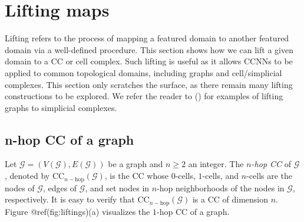\documentclass[
  12pt,
]{krantz}
\begin{document}
\section{Lifting maps}\label{lifting-maps}

Lifting refers to the process of mapping a featured domain to another
featured domain via a well-defined procedure. This section shows how we
can lift a given domain to a CC or cell complex. Such lifting is useful
as it allows CCNNs to be applied to common topological domains,
including graphs and cell/simplicial complexes. This section only
scratches the surface, as there remain many lifting constructions to be
explored. We refer the reader to
() for
examples of lifting graphs to simplicial complexes.

\subsection{n-hop CC of a graph}\label{n-hop-cc-of-a-graph}

Let \(\mathcal{G}=(V(\mathcal{G}),E(\mathcal{G}))\) be a graph and
\(n\geq 2\) an integer. The \(n\)\emph{-hop CC} of \(\mathcal{G}\),
denoted by \(\mbox{CC}_{n-\mbox{hop}}(\mathcal{G})\), is the CC whose
\(0\)-cells, \(1\)-cells, and \(n\)-cells are the nodes of
\(\mathcal{G}\), edges of \(\mathcal{G}\), and set nodes in \(n\)-hop
neighborhoods of the nodes in \(\mathcal{G}\), respectively. It is easy
to verify that \(\mbox{CC}_{n-\mbox{hop}}(\mathcal{G})\) is a CC of
dimension \(n\). Figure @ref(fig:liftings)(a) visualizes the \(1\)-hop
CC of a graph.
\end{document}
